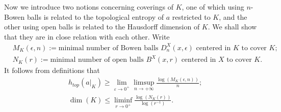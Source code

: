 \documentclass[reqno,12pt]{amsart}
\theoremstyle{definition}
\numberwithin{equation}{section}
\newcommand{\eps}{\varepsilon}
\begin{document}
{Now we introduce two notions concerning coverings of $K$, one of which using $n$-Bowen balls is related to the topological entropy of $a$ restricted to $K$, and the other using open balls is related to the Hausdorff dimension of $K$. We shall show that they are in close relation with each other. Write \begin{equation*}
    \begin{aligned}
        &M_K(\epsilon,n):=\text{minimal number of Bowen balls }D_n^X(x,\epsilon) \text{ centered in } K \text{ to cover }K;\\
        &N_K(r):= \text{minimal number of open balls }B^X(x,r) \text{ centered in } X \text{ to cover }K.
    \end{aligned}
\end{equation*}
It follows from definitions that \begin{equation*}
    \begin{aligned}
        &h_{top}(a|_K)\geq\lim_{\eps\to 0^+}\limsup_{n\to +\infty}\frac{\log(M_K(\epsilon,n))}{n};\\
        &\dim(K)\leq \liminf_{r\to 0^+}\frac{\log(N_K(r))}{\log(r^{-1})}.
    \end{aligned}
\end{equation*}

}
\end{document}
